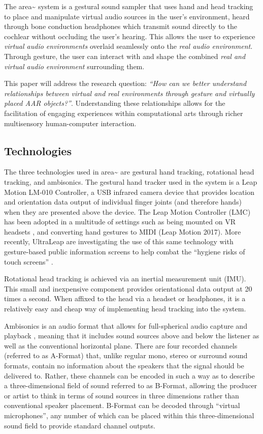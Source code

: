 The area\textasciitilde{} system is a gestural sound sampler that uses hand and head tracking to place and manipulate virtual audio sources in the user’s environment, heard through bone conduction headphones which transmit sound directly to the cochlear without occluding the user’s hearing. This allows the user to experience \textit{virtual audio environments} overlaid seamlessly onto the \textit{real audio environment}. Through gesture, the user can interact with and shape the combined \textit{real and virtual audio environment} surrounding them.

This paper will address the research question: \textit{“How can we better understand relationships between virtual and real environments through gesture and virtually placed AAR objects?”}. Understanding these relationships allows for the facilitation of engaging experiences within computational arts through richer multisensory human-computer interaction.

\subsection{Technologies}                       \label{sec: area-intro-tech}
The three technologies used in area\textasciitilde{} are gestural hand tracking, rotational head tracking, and ambisonics. The gestural hand tracker used in the system is a Leap Motion LM-010 Controller, a USB infrared camera device that provides location and orientation data output of individual finger joints (and therefore hands) when they are presented above the device. The Leap Motion Controller (LMC) has been adopted in a multitude of settings such as being mounted on VR headsets \citep{leapmotion2016}, and converting hand gestures to MIDI (Leap Motion 2017). More recently, UltraLeap are investigating the use of this same technology with gesture-based public information screens to help combat the “hygiene risks of touch screens” \citeyearpar{ultraleap2020a}.

Rotational head tracking is achieved via an inertial measurement unit (IMU). This small and inexpensive component provides orientational data output at 20 times a second. When affixed to the head via a headset or headphones, it is a relatively easy and cheap way of implementing head tracking into the system.

Ambisonics is an audio format that allows for full-spherical audio capture and playback \citep{gerzon1973}, meaning that it includes sound sources above and below the listener as well as the conventional horizontal plane. There are four recorded channels (referred to as A-Format) that, unlike regular mono, stereo or surround sound formats, contain no information about the speakers that the signal should be delivered to. Rather, these channels can be encoded in such a way as to describe a three-dimensional field of sound referred to as B-Format, allowing the producer or artist to think in terms of sound sources in three dimensions rather than conventional speaker placement. B-Format can be decoded through “virtual microphones”, any number of which can be placed within this three-dimensional sound field to provide standard channel outputs.

